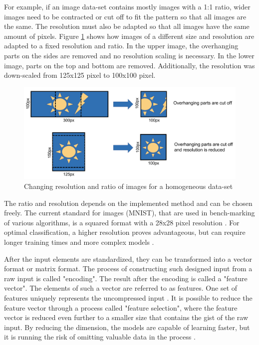 For example, if an image data-set contains mostly images with a 1:1 ratio, wider images need to be contracted or cut off to fit the pattern so that all images are the same. The resolution must also be adapted so that all images have the same amount of pixels.
Figure \ref{fig:pixel} shows how images of a different size and resolution are adapted to a fixed resolution and ratio. In the upper image, the overhanging parts on the sides are removed and no resolution scaling is necessary. In the lower image, parts on the top and bottom are removed. Additionally, the resolution was down-scaled from 125x125 pixel to 100x100 pixel. 

\begin{figure}[H]
	\centering
	\includegraphics[width=0.95\linewidth]{IMGs/pixel.png}
	\caption{Changing resolution and ratio of images for a homogeneous data-set}
	\label{fig:pixel}
\end{figure}

The ratio and resolution depends on the implemented method and can be chosen freely. 
The current standard for images (MNIST), that are used in bench-marking of various algorithms, is a squared format with a 28x28 pixel resolution \cite{Baldominos}.
For optimal classification, a higher resolution proves advantageous, but can require longer training times and more complex models \cite{Kannojia,Huang}.

After the input elements are standardized, they can be transformed into a vector format or matrix format. The process of constructing such designed input from a raw input is called "encoding". The result after the encoding is called a "feature vector". The elements of such a vector are referred to as features. One set of features uniquely represents the uncompressed input \cite{Theodoridis}. It is possible to reduce the feature vector through a process called "feature selection", where the feature vector is reduced even further to a smaller size that contains the gist of the raw input. By reducing the dimension, the models are capable of learning faster, but it is running the risk of omitting valuable data in the process \cite{Janiesch}.

